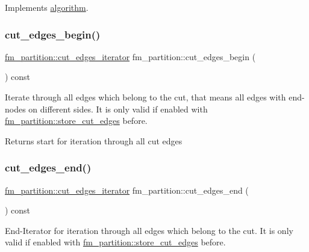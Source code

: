 Implements \mbox{\hyperlink{classalgorithm_a76361fb03ad1cf643affc51821e43bed}{algorithm}}.

\mbox{\label{classfm__partition_a36990b62c6d2d9e4948f42d805afc626}} 
\subsubsection{\texorpdfstring{cut\+\_\+edges\+\_\+begin()}{cut\_edges\_begin()}}
{\footnotesize\ttfamily \mbox{\hyperlink{classfm__partition_aede10aea3dda6be8014ce60fca728efe}{fm\+\_\+partition\+::cut\+\_\+edges\+\_\+iterator}} fm\+\_\+partition\+::cut\+\_\+edges\+\_\+begin (\begin{DoxyParamCaption}{ }\end{DoxyParamCaption}) const}

Iterate through all edges which belong to the cut, that means all edges with end-\/nodes on different sides. It is only valid if enabled with \mbox{\hyperlink{classfm__partition_ad0870674a1fb8e1c882f6855e32aec09}{fm\+\_\+partition\+::store\+\_\+cut\+\_\+edges}} before.

\begin{DoxyReturn}{Returns}
start for iteration through all cut edges 
\end{DoxyReturn}
\mbox{\label{classfm__partition_af213672f08e03878183659fa8c2ed61e}} 
\subsubsection{\texorpdfstring{cut\+\_\+edges\+\_\+end()}{cut\_edges\_end()}}
{\footnotesize\ttfamily \mbox{\hyperlink{classfm__partition_aede10aea3dda6be8014ce60fca728efe}{fm\+\_\+partition\+::cut\+\_\+edges\+\_\+iterator}} fm\+\_\+partition\+::cut\+\_\+edges\+\_\+end (\begin{DoxyParamCaption}{ }\end{DoxyParamCaption}) const}

End-\/\+Iterator for iteration through all edges which belong to the cut. It is only valid if enabled with \mbox{\hyperlink{classfm__partition_ad0870674a1fb8e1c882f6855e32aec09}{fm\+\_\+partition\+::store\+\_\+cut\+\_\+edges}} before.

